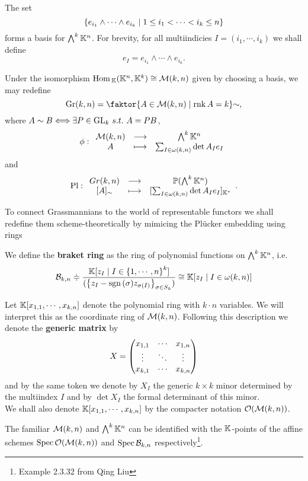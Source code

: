 \begin{remark}
The set
\[\left\{{e_{i_1}\wedge\cdots\wedge e_{i_k}\mid 1\leq i_1<\cdots<i_k\leq n}\right\}\]
forms a basis for $\bigwedge^k\mathbb{K}^n$. For brevity, for all multiindicies $I=(i_1,\cdots, i_k)$ we shall define
\[e_I=e_{i_1}\wedge\cdots\wedge e_{i_k}.\]
\end{remark}
\medskip

\noindent
Under the isomorphism $\mathrm{Hom}\,_{\mathbb{K}}(\mathbb{K}^n,\mathbb{K}^k)\cong \mathcal{M}(k,n)$ given by choosing a basis, we may redefine
\[\Gr(k,n)=\quot{\cpa{A\in \Mc(k,n)\mid \rnk A=k}}{\sim},\] 
where $A\sim B\Longleftrightarrow \exists P\in \mathrm{GL}_k\ s.t.\ A=PB$, 
\[\phi:\begin{array}{ccc} {\mathcal{M}(k,n)} & \longrightarrow & {\bigwedge^k\mathbb{K}^n}\\ {A} & \longmapsto & {\sum_{I\in \omega(k,n)}\det A_I e_I} \end{array}\]
and
\[\mathrm{Pl}:\begin{array}{ccc} {Gr(k,n)} & \longrightarrow & {\mathbb{P}(\bigwedge^k\mathbb{K}^n)}\\ {[A]_\sim} & \longmapsto & {[\sum_{I\in \omega(k,n)}\det A_I e_I]_{\mathbb{K}^\ast}} \end{array}.\]


To connect Grassmannians to the world of representable functors we shall redefine them scheme-theoretically by mimicing the Pl\"ucker embedding using rings

\begin{definition}
We define the \textbf{braket ring} as the ring of polynomial functions on $\bigwedge^k\mathbb{K}^n$, i.e.
\[\mathcal{B}_{k,n}\doteqdot\frac{\mathbb{K}[z_I\mid I\in \left\{{1,\cdots, n}\right\}^k]}{(\left\{{z_I-\mathrm{sgn}\,(\sigma)z_{\sigma(I)}}\right\}_{\sigma\in S_k})}\cong \mathbb{K}[z_I\mid I\in \omega(k,n)]\]
\end{definition}

\begin{notation}
Let $\mathbb{K}[x_{1,1},\cdots,x_{k,n}]$ denote the polynomial ring with $k\cdot n$ variables. We will interpret this as the coordinate ring of $\mathcal{M}(k,n)$. Following this description we denote the \textbf{generic matrix} by
\[X=\begin{pmatrix}
    x_{1,1} & \cdots & x_{1,n}\\
    \vdots & \ddots & \vdots\\
    x_{k,1} &\cdots & x_{k,n}\end{pmatrix}\]
and by the same token we denote by $X_I$ the generic $k\times k$ minor determined by the multiindex $I$ and by $\det X_I$ the formal determinant of this minor.\\
We shall also denote $\mathbb{K}[x_{1,1},\cdots, x_{k,n}]$ by the compacter notation $\mathcal{O}(\mathcal{M}(k,n))$.
\end{notation}

\begin{remark}
The familiar $\mathcal{M}(k,n)$ and $\bigwedge^k\mathbb{K}^n$ can be identified with the $\mathbb{K}$-points of the affine schemes $\mathrm{Spec}\, \mathcal{O}(\mathcal{M}(k,n))$ and $\mathrm{Spec}\, \mathcal{B}_{k,n}$ respectively\footnote{Example 2.3.32 from Qing Liu}.
\end{remark}

